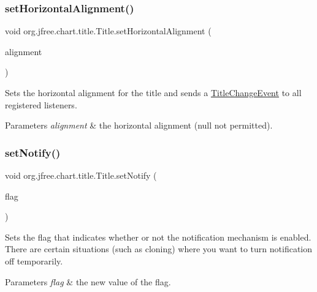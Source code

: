 \subsubsection{\texorpdfstring{set\+Horizontal\+Alignment()}{setHorizontalAlignment()}}
{\footnotesize\ttfamily void org.\+jfree.\+chart.\+title.\+Title.\+set\+Horizontal\+Alignment (\begin{DoxyParamCaption}\item[{Horizontal\+Alignment}]{alignment }\end{DoxyParamCaption})}

Sets the horizontal alignment for the title and sends a \mbox{\hyperlink{}{Title\+Change\+Event}} to all registered listeners.


\begin{DoxyParams}{Parameters}
{\em alignment} & the horizontal alignment ({\ttfamily null} not permitted). \\
\hline
\end{DoxyParams}
\mbox{\label{classorg_1_1jfree_1_1chart_1_1title_1_1_title_a007fba67dedd82a39925e8840c5a891d}} 
\subsubsection{\texorpdfstring{set\+Notify()}{setNotify()}}
{\footnotesize\ttfamily void org.\+jfree.\+chart.\+title.\+Title.\+set\+Notify (\begin{DoxyParamCaption}\item[{boolean}]{flag }\end{DoxyParamCaption})}

Sets the flag that indicates whether or not the notification mechanism is enabled. There are certain situations (such as cloning) where you want to turn notification off temporarily.


\begin{DoxyParams}{Parameters}
{\em flag} & the new value of the flag. \\
\hline
\end{DoxyParams}
\mbox{\label{classorg_1_1jfree_1_1chart_1_1title_1_1_title_a5e0ed1b3381e2c376265d81c913fb15b}} 
